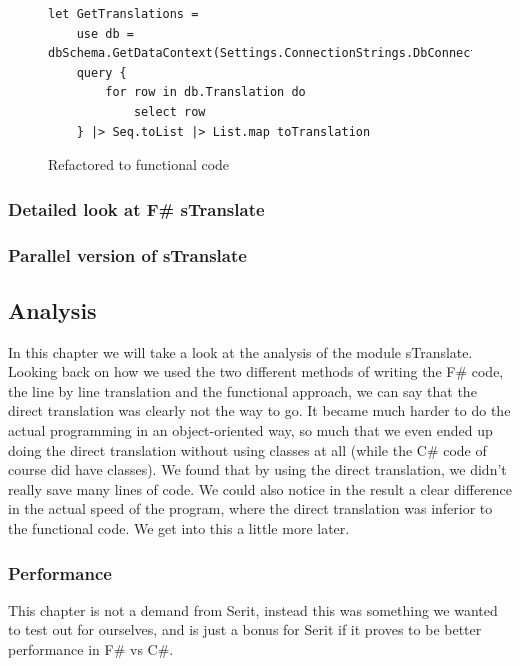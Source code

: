 \documentclass[12pt, a4paper]{article}
\begin{document}
\begin{figure}[!h]
\begin{lstlisting}
let GetTranslations =
    use db = dbSchema.GetDataContext(Settings.ConnectionStrings.DbConnectionString)
    query {
        for row in db.Translation do 
            select row
    } |> Seq.toList |> List.map toTranslation 
\end{lstlisting}
\caption{Refactored to functional code}
\end{figure}

\newpage


\subsubsection{Detailed look at F\# sTranslate}

\newpage


\subsubsection{Parallel version of sTranslate}

\newpage


\subsection{Analysis}
In this chapter we will take a look at the analysis of the module sTranslate.
Looking back on how we used the two different methods of writing the F\# code, the line by line translation and the functional approach, we can say that the direct translation was clearly not the way to go. It became much harder to do the actual programming in an object-oriented way, so much that we even ended up doing the direct translation without using classes at all (while the C\# code of course did have classes). We found that by using the direct translation, we didn't really save many lines of code. We could also notice in the result a clear difference in the actual speed of the program, where the direct translation was inferior to the functional code. We get into this a little more later.

\subsubsection{Performance}
This chapter is not a demand from Serit, instead this was something we wanted to test out for ourselves, and is just a bonus for Serit if it proves to be better performance in F\# vs C\#.
\end{document}
